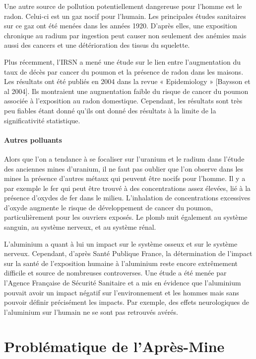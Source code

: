 \documentclass{article}
\begin{document}
Une autre source de pollution potentiellement dangereuse pour l’homme est le radon. Celui-ci est un gaz nocif pour l’humain. Les principales études sanitaires sur ce gaz ont été menées dans les années 1920. D’après elles, une exposition chronique au radium par ingestion peut causer non seulement des anémies mais aussi des cancers et une détérioration des tissus du squelette.

Plus récemment, l’IRSN a mené une étude sur le lien entre l’augmentation du taux de décès par cancer du poumon et la présence de radon dans les maisons. Les résultats ont été publiés en 2004 dans la revue « Epidemiology » [Baysson et al 2004]. Ils montraient une augmentation faible du risque de cancer du poumon associée à l’exposition au radon  domestique. Cependant, les résultats sont très peu fiables étant donné qu’ils ont donné des résultats à la limite de la significativité statistique.  

\paragraph{Autres polluants}

Alors que l’on a tendance à se focaliser sur l’uranium et le radium dans l’étude des anciennes mines d’uranium, il ne faut pas oublier que l’on observe dans les mines la présence d'autres métaux qui peuvent être nocifs pour l’homme. Il y a par exemple le fer qui peut être trouvé à des concentrations assez élevées, lié à la présence d'oxydes de fer dans le milieu.  L'inhalation de concentrations excessives d'oxyde augmente le risque de développement de cancer du poumon, particulièrement pour les ouvriers exposés. Le plomb nuit également au système sanguin, au système nerveux, et au système rénal.

L’aluminium a quant à lui un impact sur le système osseux et sur le système nerveux. Cependant, d’après Santé Publique France, la détermination de l'impact sur la santé de l'exposition humaine à l'aluminium reste encore extrêmement difficile et source de nombreuses controverses. Une étude a été menée par l’Agence Française de Sécurité Sanitaire et a mis en évidence que l’aluminium pouvait avoir un impact négatif sur l’environnement et les hommes mais sans pouvoir définir précisément les impacts.  Par exemple, des effets neurologiques de l’aluminium sur l’humain ne se sont pas retrouvés avérés.

\newpage
\section{Problématique de l’Après-Mine}
\end{document}
